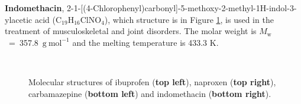 \textbf{Indomethacin}, 2-{1-[(4-Chlorophenyl)carbonyl]-5-methoxy-2-methyl-1H-indol-3-yl}acetic acid (C$_{19}$H$_{16}$ClNO$_{4}$), which structure is in Figure \ref{fig:APIs}, is used in the treatment of musculoskeletal and joint disorders. The molar weight is $M_\mathrm{w}$~=~357.8~$\mathrm{g\ mol^{-1}}$ and the melting temperature is 433.3 K. \cite{stejfa_heat_2021}
\begin{figure}[htb!]
	\hspace{1.2cm}
	\hspace{2cm}
	\\
	\caption{Molecular structures of ibuprofen (\textbf{top left}), naproxen (\textbf{top right}), carbamazepine (\textbf{bottom left}) and indomethacin (\textbf{bottom right}).}
	\label{fig:APIs}
\end{figure}

